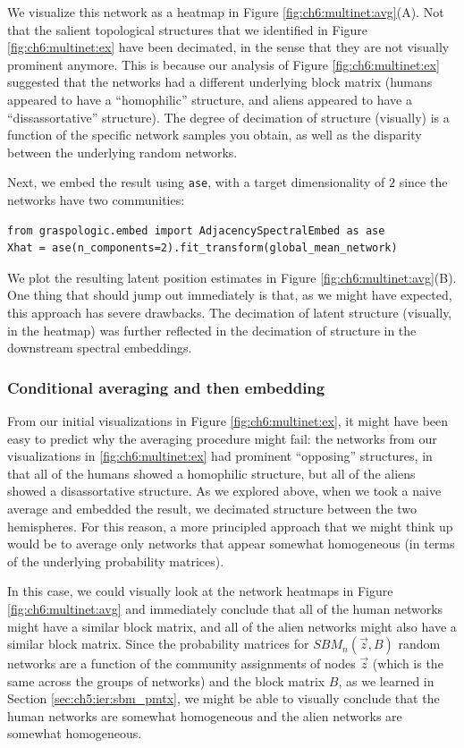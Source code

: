 We visualize this network as a heatmap in Figure \ref{fig:ch6:multinet:avg}(A). Not that the salient topological structures that we identified in Figure \ref{fig:ch6:multinet:ex} have been decimated, in the sense that they are not visually prominent anymore. This is because our analysis of Figure \ref{fig:ch6:multinet:ex} suggested that the networks had a different underlying block matrix (humans appeared to have a ``homophilic'' structure, and aliens appeared to have a ``dissassortative'' structure). The degree of decimation of structure (visually) is a function of the specific network samples you obtain, as well as the disparity between the underlying random networks.

Next, we embed the result using \texttt{ase}, with a target dimensionality of $2$ since the networks have two communities:

\begin{lstlisting}[style=python]
from graspologic.embed import AdjacencySpectralEmbed as ase
Xhat = ase(n_components=2).fit_transform(global_mean_network)
\end{lstlisting}

We plot the resulting latent position estimates in Figure \ref{fig:ch6:multinet:avg}(B). One thing that should jump out immediately is that, as we might have expected, this approach has severe drawbacks. The decimation of latent structure (visually, in the heatmap) was further reflected in the decimation of structure in the downstream spectral embeddings.

\subsubsection{Conditional averaging and then embedding}

From our initial visualizations in Figure \ref{fig:ch6:multinet:ex}, it might have been easy to predict why the averaging procedure might fail: the networks from our visualizations in \ref{fig:ch6:multinet:ex} had prominent ``opposing'' structures, in that all of the humans showed a homophilic structure, but all of the aliens showed a disassortative structure. As we explored above, when we took a naive average and embedded the result, we decimated structure between the two hemispheres. For this reason, a more principled approach that we might think up would be to average only networks that appear somewhat homogeneous (in terms of the underlying probability matrices).

In this case, we could visually look at the network heatmaps in Figure \ref{fig:ch6:multinet:avg} and immediately conclude that all of the human networks might have a similar block matrix, and all of the alien networks might also have a similar block matrix. Since the probability matrices for $SBM_n(\vec z, B)$ random networks are a function of the community assignments of nodes $\vec z$ (which is the same across the groups of networks) and the block matrix $B$, as we learned in Section \ref{sec:ch5:ier:sbm_pmtx}, we might be able to visually conclude that the human networks are somewhat homogeneous and the alien networks are somewhat homogeneous.


